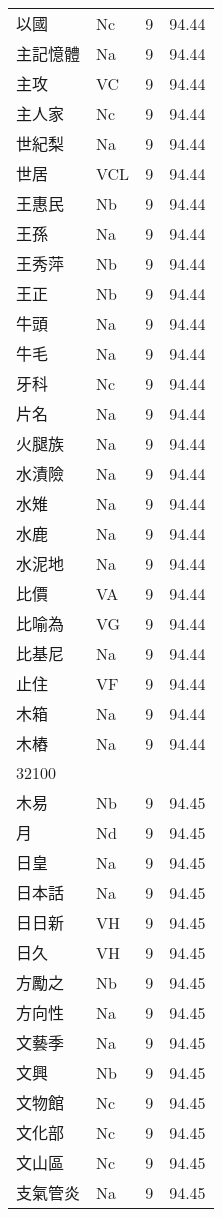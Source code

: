 \documentclass[twocolumn]{book}
\begin{document}
\begin{supertabular}{llrr}
以國 & Nc & 9 &  94.44\\
主記憶體 & Na & 9 &  94.44\\
主攻 & VC & 9 &  94.44\\
主人家 & Nc & 9 &  94.44\\
世紀梨 & Na & 9 &  94.44\\
世居 & VCL & 9 &  94.44\\
王惠民 & Nb & 9 &  94.44\\
王孫 & Na & 9 &  94.44\\
王秀萍 & Nb & 9 &  94.44\\
王正 & Nb & 9 &  94.44\\
牛頭 & Na & 9 &  94.44\\
牛毛 & Na & 9 &  94.44\\
牙科 & Nc & 9 &  94.44\\
片名 & Na & 9 &  94.44\\
火腿族 & Na & 9 &  94.44\\
水漬險 & Na & 9 &  94.44\\
水雉 & Na & 9 &  94.44\\
水鹿 & Na & 9 &  94.44\\
水泥地 & Na & 9 &  94.44\\
比價 & VA & 9 &  94.44\\
比喻為 & VG & 9 &  94.44\\
比基尼 & Na & 9 &  94.44\\
止住 & VF & 9 &  94.44\\
木箱 & Na & 9 &  94.44\\
木樁 & Na & 9 &  94.44\\
32100\\
木易 & Nb & 9 &  94.45\\
月 & Nd & 9 &  94.45\\
日皇 & Na & 9 &  94.45\\
日本話 & Na & 9 &  94.45\\
日日新 & VH & 9 &  94.45\\
日久 & VH & 9 &  94.45\\
方勵之 & Nb & 9 &  94.45\\
方向性 & Na & 9 &  94.45\\
文藝季 & Na & 9 &  94.45\\
文興 & Nb & 9 &  94.45\\
文物館 & Nc & 9 &  94.45\\
文化部 & Nc & 9 &  94.45\\
文山區 & Nc & 9 &  94.45\\
支氣管炎 & Na & 9 &  94.45\\

\end{supertabular}
\end{document}
